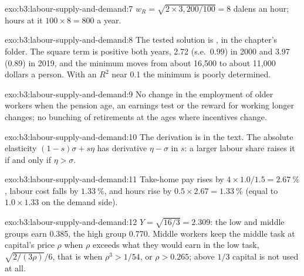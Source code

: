 \begin{solution}{exo:b3:labour-supply-and-demand:7}
$w_R = \sqrt{2 \times 3{,}200/100} = 8$ dalens an hour; hours at it $100 \times 8 = 800$ a year.
\end{solution}

\begin{solution}{exo:b3:labour-supply-and-demand:8}
The tested solution is , in the chapter's  folder.
The square term is positive both years, 2.72 (s.e.\ 0.99) in 2000 and 3.97 (0.89) in 2019, and
the minimum moves from about 16{,}500 to about 11{,}000 dollars a person. %
With an $R^2$ near 0.1 the minimum is poorly determined.
\end{solution}

\begin{solution}{exo:b3:labour-supply-and-demand:9}
No change in the employment of older workers when the pension age, an earnings
test or the reward for working longer changes; no bunching of retirements at the
ages where incentives change.
\end{solution}

\begin{solution}{exo:b3:labour-supply-and-demand:10}
The derivation is in the text. The absolute elasticity $(1 - s)\sigma + s\eta$ has derivative $\eta - \sigma$ in $s$:
a larger labour share raises it if and only if $\eta > \sigma$.
\end{solution}

\begin{solution}{exo:b3:labour-supply-and-demand:11}
Take-home pay rises by $4 \times 1.0/1.5 = 2.67~\%$, labour cost falls by $1.33~\%$, and hours rise by
$0.5 \times 2.67 = 1.33~\%$ (equal to $1.0 \times 1.33$ on the demand side).
\end{solution}

\begin{solution}{exo:b3:labour-supply-and-demand:12}
$Y = \sqrt{16/3} = 2.309$: the low and middle groups earn 0.385, the high group 0.770. Middle workers keep the
middle task at capital's price $\rho$ when $\rho$ exceeds what they would earn in the low task,
$\sqrt{2/(3\rho)}/6$, that is when $\rho^3 > 1/54$, or $\rho > 0.265$; above $1/3$ capital is not used at all.
\end{solution}

